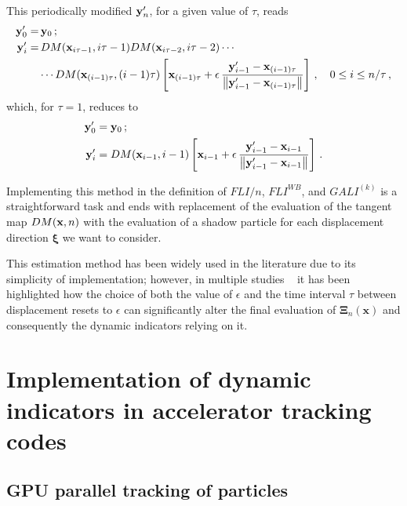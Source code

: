 This periodically modified $\vb{y}'_n$, for a given value of $\tau$, reads
\begin{equation}
    \begin{aligned}
        \vb{y}'_0 =&\, \vb{y}_0 \,;  \\
        \vb{y}'_i =&\, DM(\vb{x}_{i\tau - 1}, i\tau - 1)DM(\vb{x}_{i\tau - 2}, i\tau - 2)\cdots \\
        &\cdots DM(\vb{x}_{(i-1)\tau}, (i-1)\tau)\left[\vb{x}_{(i-1)\tau}+\epsilon\,\frac{\vb{y}'_{i-1}-\vb{x}_{(i-1)\tau}}{\norm{\vb{y}'_{i-1}-\vb{x}_{(i-1)\tau}}}\right]\,, \quad 0 \leq i \leq n/\tau \,,        
    \end{aligned}
\end{equation}
which, for $\tau=1$, reduces to
\begin{equation}
\begin{aligned}
    \vb{y}'_0 &= \vb{y}_0 \,; \\
    \vb{y}'_i &= DM(\vb{x}_{i-1}, i-1)\left[\vb{x}_{i-1}+\epsilon\,\frac{\vb{y}'_{i-1}-\vb{x}_{i-1}}{\norm{\vb{y}'_{i-1}-\vb{x}_{i-1}}}\right]\,.
\end{aligned}
\end{equation}

Implementing this method in the definition of $FLI/n$, $FLI^{WB}$, and $GALI^{(k)}$ is a straightforward task and ends with replacement of the evaluation of the tangent map $DM(\vb{x}, n)$ with the evaluation of a shadow particle for each displacement direction $\boldsymbol{\xi}$ we want to consider.

This estimation method has been widely used in the literature due to its simplicity of implementation; however, in multiple studies ~\cite{Tancredi_2001, Skokos2010b} it has been highlighted how the choice of both the value of $\epsilon$ and the time interval $\tau$ between displacement resets to $\epsilon$ can significantly alter the final evaluation of $\boldsymbol{\Xi}_{n}(\mathbf{x})$ and consequently the dynamic indicators relying on it.


\section{Implementation of dynamic indicators in accelerator tracking codes} \label{sec:8:implement}
%

\subsection{GPU parallel tracking of particles}

